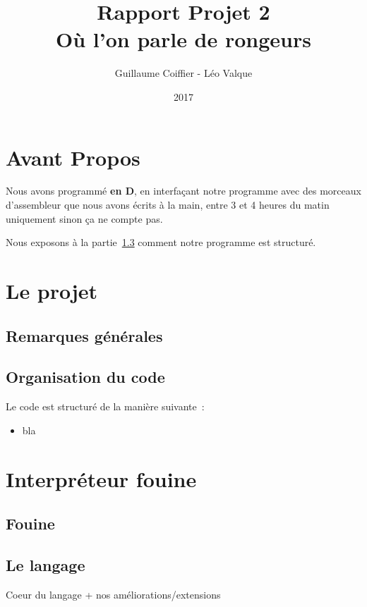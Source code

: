 \documentclass{article}
\title{ \Huge{Rapport Projet 2} \\ Où l'on parle de rongeurs}
\author{Guillaume Coiffier - Léo Valque}
\date{2017}
\begin{document}
\maketitle
\tableofcontents
\newpage

\section*{Avant Propos}

Nous avons programmé \textbf{en D}, en interfaçant notre programme
avec des morceaux d'assembleur que nous avons écrits à la main, entre
3 et 4 heures du matin uniquement sinon ça ne compte pas.

Nous exposons à la partie~\ref{s:orga} comment notre programme est structuré.

\section{Le projet}

\subsection{Remarques générales}

\subsection{}

\subsection{Organisation du code}
\label{s:orga}

Le code est structuré de la manière suivante~:
\begin{itemize}
\item bla
\end{itemize}

\section{Interpréteur fouine}

\subsection{Fouine}

\subsection{Le langage}
Coeur du langage + nos améliorations/extensions
\end{document}
